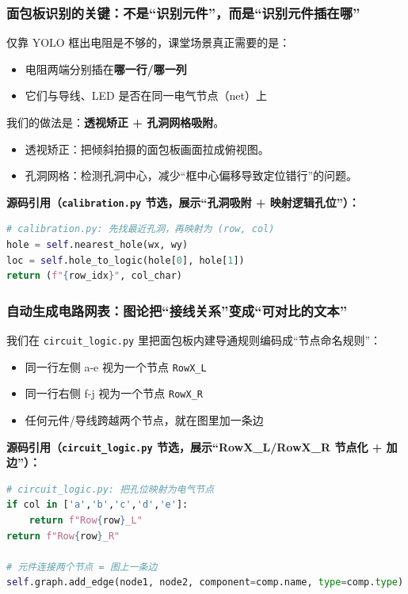 \documentclass[a4paper,AutoFakeBold,oneside,12pt]{book}
\begin{document}
\subsubsection{面包板识别的关键：不是“识别元件”，而是“识别元件插在哪”}
仅靠 YOLO 框出电阻是不够的，课堂场景真正需要的是：
\begin{itemize}
    \item 电阻两端分别插在\textbf{哪一行/哪一列}
    \item 它们与导线、LED 是否在同一电气节点（net）上
\end{itemize}

我们的做法是：\textbf{透视矫正 + 孔洞网格吸附}。
\begin{itemize}
    \item 透视矫正：把倾斜拍摄的面包板画面拉成俯视图。
    \item 孔洞网格：检测孔洞中心，减少“框中心偏移导致定位错行”的问题。
\end{itemize}

\textbf{源码引用（\texttt{calibration.py} 节选，展示“孔洞吸附 + 映射逻辑孔位”）：}
\begin{lstlisting}[language=Python]
# calibration.py: 先找最近孔洞，再映射为 (row, col)
hole = self.nearest_hole(wx, wy)
loc = self.hole_to_logic(hole[0], hole[1])
return (f"{row_idx}", col_char)
\end{lstlisting}

\subsubsection{自动生成电路网表：图论把“接线关系”变成“可对比的文本”}
我们在 \texttt{circuit\_logic.py} 里把面包板内建导通规则编码成“节点命名规则”：
\begin{itemize}
    \item 同一行左侧 a-e 视为一个节点 \texttt{RowX\_L}
    \item 同一行右侧 f-j 视为一个节点 \texttt{RowX\_R}
    \item 任何元件/导线跨越两个节点，就在图里加一条边
\end{itemize}

\textbf{源码引用（\texttt{circuit\_logic.py} 节选，展示“RowX\_L/RowX\_R 节点化 + 加边”）：}
\begin{lstlisting}[language=Python]
# circuit_logic.py: 把孔位映射为电气节点
if col in ['a','b','c','d','e']:
    return f"Row{row}_L"
return f"Row{row}_R"

# 元件连接两个节点 = 图上一条边
self.graph.add_edge(node1, node2, component=comp.name, type=comp.type)
\end{lstlisting}
\end{document}
